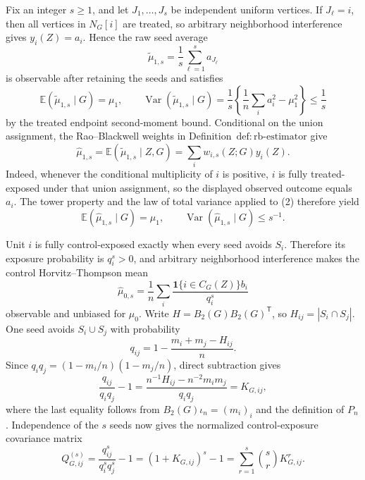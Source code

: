 Fix an integer \(s\ge1\), and let \(J_1,\ldots,J_s\) be independent uniform vertices.  If \(J_\ell=i\), then all vertices in \(N_G[i]\) are treated, so arbitrary neighborhood interference gives \(y_i(Z)=a_i\).  Hence the raw seed average
\[
\widetilde\mu_{1,s}=\frac1s\sum_{\ell=1}^s a_{J_\ell}
\]
is observable after retaining the seeds and satisfies
\[
\mathbb E(\widetilde\mu_{1,s}\mid G)=\mu_1,
\qquad
\operatorname{Var}(\widetilde\mu_{1,s}\mid G)
=\frac1s\left\{\frac1n\sum_i a_i^2-\mu_1^2\right\}\le\frac1s
\tag{2}
\]
by the treated endpoint second-moment bound.  Conditional on the union assignment, the Rao--Blackwell weights in Definition~\(\mathrm{def{:}rb\mbox{-}estimator}\) give
\[
\widehat\mu_{1,s}
=\mathbb E(\widetilde\mu_{1,s}\mid Z,G)
=\sum_i w_{i,s}(Z;G)y_i(Z).
\]
Indeed, whenever the conditional multiplicity of \(i\) is positive, \(i\) is fully treated-exposed under that union assignment, so the displayed observed outcome equals \(a_i\).  The tower property and the law of total variance applied to (2) therefore yield
\[
\mathbb E(\widehat\mu_{1,s}\mid G)=\mu_1,
\qquad
\operatorname{Var}(\widehat\mu_{1,s}\mid G)\le s^{-1}.
\tag{3}
\]

Unit \(i\) is fully control-exposed exactly when every seed avoids \(S_i\).  Therefore its exposure probability is \(q_i^s>0\), and arbitrary neighborhood interference makes the control Horvitz--Thompson mean
\[
\widehat\mu_{0,s}=\frac1n\sum_i
\frac{\mathbf 1\{i\in C_G(Z)\}b_i}{q_i^s}
\]
observable and unbiased for \(\mu_0\).  Write \(H=B_2(G)B_2(G)^{\mathsf T}\), so \(H_{ij}=|S_i\cap S_j|\).  One seed avoids \(S_i\cup S_j\) with probability
\[
q_{ij}=1-\frac{m_i+m_j-H_{ij}}n.
\]
Since \(q_iq_j=(1-m_i/n)(1-m_j/n)\), direct subtraction gives
\[
\frac{q_{ij}}{q_iq_j}-1
=\frac{n^{-1}H_{ij}-n^{-2}m_im_j}{q_iq_j}
=K_{G,ij},
\tag{4}
\]
where the last equality follows from \(B_2(G)\iota_n=(m_i)_i\) and the definition of \(P_n\).  Independence of the \(s\) seeds now gives the normalized control-exposure covariance matrix
\[
Q^{(s)}_{G,ij}
=\frac{q_{ij}^s}{q_i^sq_j^s}-1
=(1+K_{G,ij})^s-1
=\sum_{r=1}^s\binom sr K_{G,ij}^r.
\tag{5}
\]

